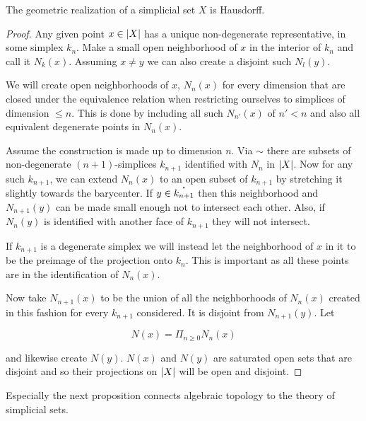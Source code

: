 \documentclass[../../main.tex]{subfiles}
\begin{document}
    \begin{proposition}
        The geometric realization of a simplicial set $X$ is Hausdorff.
    \end{proposition}

    \begin{proof}
        Any given point $x \in \geom[X]$ has a unique non-degenerate representative, in some simplex $k_n$. Make a small open neighborhood of $x$ in the interior of $k_n$ and call it $N_k(x)$. Assuming $x \neq y$ we can also create a disjoint such $N_l(y)$.
        
        We will create open neighborhoods of $x$, $N_n(x)$ for every dimension that are closed under the equivalence relation when restricting ourselves to simplices of dimension $\leq n$. This is done by including all such $N_{n'}(x)$ of $n' < n$ and also all equivalent degenerate points in $N_n(x)$.
        
        Assume the construction is made up to dimension $n$. Via $\sim$ there are subsets of non-degenerate $(n+1)$-simplices $k_{n+1}$ identified with $N_n$ in $\geom[X]$. Now for any such $k_{n+1}$, we can extend $N_n(x)$ to an open subset of $k_{n+1}$ by stretching it slightly towards the barycenter. If $y \in \interior{k_{n+1}}$ then this neighborhood and $N_{n+1}(y)$ can be made small enough not to intersect each other. Also, if $N_{n}(y)$ is identified with another face of $k_{n+1}$ they will not intersect.

        If $k_{n+1}$ is a degenerate simplex we will instead let the neighborhood of $x$ in it to be the preimage of the projection onto $k_n$. This is important as all these points are in the identification of $N_n(x)$.

        Now take $N_{n+1}(x)$ to be the union of all the neighborhoods of $N_n(x)$ created in this fashion for every $k_{n+1}$ considered. It is disjoint from $N_{n+1}(y)$. Let

        \begin{equation*}
            N(x) = \Pi_{n \geq 0} N_n(x)
        \end{equation*}

        and likewise create $N(y)$. $N(x)$ and $N(y)$ are saturated open sets that are disjoint and so their projections on $\geom[X]$ will be open and disjoint.
    \end{proof}
    
    Especially the next proposition connects algebraic topology to the theory of simplicial sets.
\end{document}
